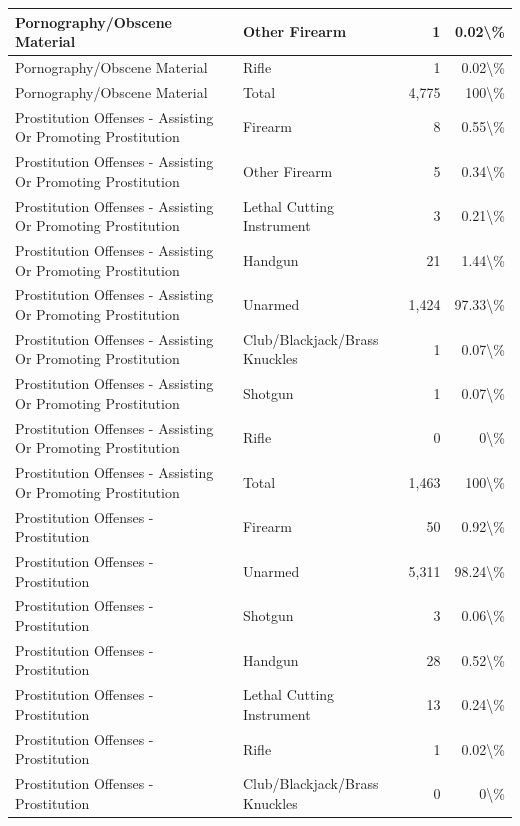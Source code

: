 \documentclass[
]{krantz}
\begin{document}
\begin{longtable}[t]{l|l|r|r}
\hline
Pornography/Obscene Material & Other Firearm & 1 & 0.02\textbackslash{}\%\\
\hline
Pornography/Obscene Material & Rifle & 1 & 0.02\textbackslash{}\%\\
\hline
Pornography/Obscene Material & Total & 4,775 & 100\textbackslash{}\%\\
\hline
Prostitution Offenses - Assisting Or Promoting Prostitution & Firearm & 8 & 0.55\textbackslash{}\%\\
\hline
Prostitution Offenses - Assisting Or Promoting Prostitution & Other Firearm & 5 & 0.34\textbackslash{}\%\\
\hline
Prostitution Offenses - Assisting Or Promoting Prostitution & Lethal Cutting Instrument & 3 & 0.21\textbackslash{}\%\\
\hline
Prostitution Offenses - Assisting Or Promoting Prostitution & Handgun & 21 & 1.44\textbackslash{}\%\\
\hline
Prostitution Offenses - Assisting Or Promoting Prostitution & Unarmed & 1,424 & 97.33\textbackslash{}\%\\
\hline
Prostitution Offenses - Assisting Or Promoting Prostitution & Club/Blackjack/Brass Knuckles & 1 & 0.07\textbackslash{}\%\\
\hline
Prostitution Offenses - Assisting Or Promoting Prostitution & Shotgun & 1 & 0.07\textbackslash{}\%\\
\hline
Prostitution Offenses - Assisting Or Promoting Prostitution & Rifle & 0 & 0\textbackslash{}\%\\
\hline
Prostitution Offenses - Assisting Or Promoting Prostitution & Total & 1,463 & 100\textbackslash{}\%\\
\hline
Prostitution Offenses - Prostitution & Firearm & 50 & 0.92\textbackslash{}\%\\
\hline
Prostitution Offenses - Prostitution & Unarmed & 5,311 & 98.24\textbackslash{}\%\\
\hline
Prostitution Offenses - Prostitution & Shotgun & 3 & 0.06\textbackslash{}\%\\
\hline
Prostitution Offenses - Prostitution & Handgun & 28 & 0.52\textbackslash{}\%\\
\hline
Prostitution Offenses - Prostitution & Lethal Cutting Instrument & 13 & 0.24\textbackslash{}\%\\
\hline
Prostitution Offenses - Prostitution & Rifle & 1 & 0.02\textbackslash{}\%\\
\hline
Prostitution Offenses - Prostitution & Club/Blackjack/Brass Knuckles & 0 & 0\textbackslash{}\%\\

\end{longtable}
\end{document}
